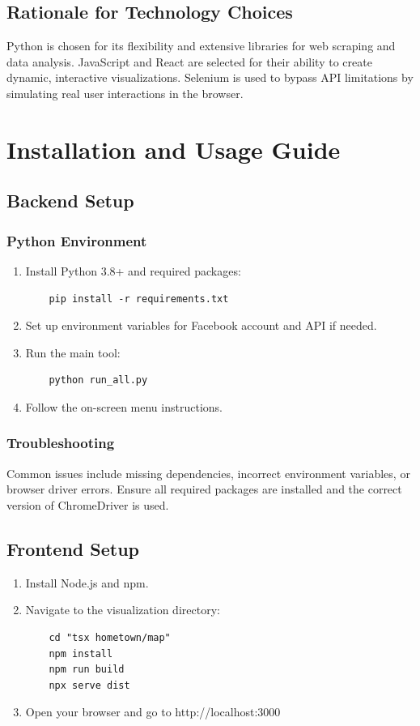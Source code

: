 \documentclass[13pt,a4paper]{report}
\begin{document}
\section{Rationale for Technology Choices}
Python is chosen for its flexibility and extensive libraries for web scraping and data analysis. JavaScript and React are selected for their ability to create dynamic, interactive visualizations. Selenium is used to bypass API limitations by simulating real user interactions in the browser.

\chapter{Installation and Usage Guide}
\section{Backend Setup}
\subsection{Python Environment}
\begin{enumerate}
    \item Install Python 3.8+ and required packages:
    \begin{verbatim}
    pip install -r requirements.txt
    \end{verbatim}
    \item Set up environment variables for Facebook account and API if needed.
    \item Run the main tool:
    \begin{verbatim}
    python run_all.py
    \end{verbatim}
    \item Follow the on-screen menu instructions.
\end{enumerate}

\subsection{Troubleshooting}
Common issues include missing dependencies, incorrect environment variables, or browser driver errors. Ensure all required packages are installed and the correct version of ChromeDriver is used.

\section{Frontend Setup}
\begin{enumerate}
    \item Install Node.js and npm.
    \item Navigate to the visualization directory:
    \begin{verbatim}
    cd "tsx hometown/map"
    npm install
    npm run build
    npx serve dist
    \end{verbatim}
    \item Open your browser and go to http://localhost:3000
\end{enumerate}
\end{document}
